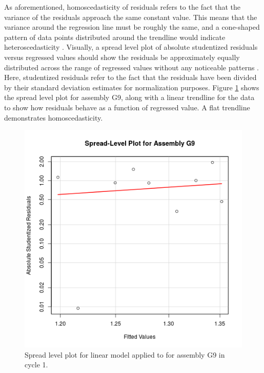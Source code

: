 \documentclass{article}
\begin{document}
As aforementioned, homoscedasticity of residuals refers to the fact that the variance of the residuals approach the same constant value. This means that the variance around the regression line must be roughly the same, and a cone-shaped pattern of data points distributed around the trendline would indicate heteroscedasticity \cite{harrell2015regression}. Visually, a spread level plot of absolute studentized residuals versus regressed values should show the residuals be approximately equally distributed across the range of regressed values without any noticeable patterns \cite{faraway2014linear}. Here, studentized residuals refer to the fact that the residuals have been divided by their standard deviation estimates for normalization purposes. Figure \ref{fig:lm_G9_slp} shows the spread level plot for assembly G9, along with a linear trendline for the data to show how residuals behave as a function of regressed value. A flat trendline demonstrates homoscedasticity.

\begin{figure}[!htb]
\centering
\includegraphics[keepaspectratio, width = 3.5 in]{figures/G9_slp.png}
\caption{Spread level plot for linear model applied to for assembly G9 in cycle 1.}
\label{fig:lm_G9_slp}
\end{figure}
\end{document}
